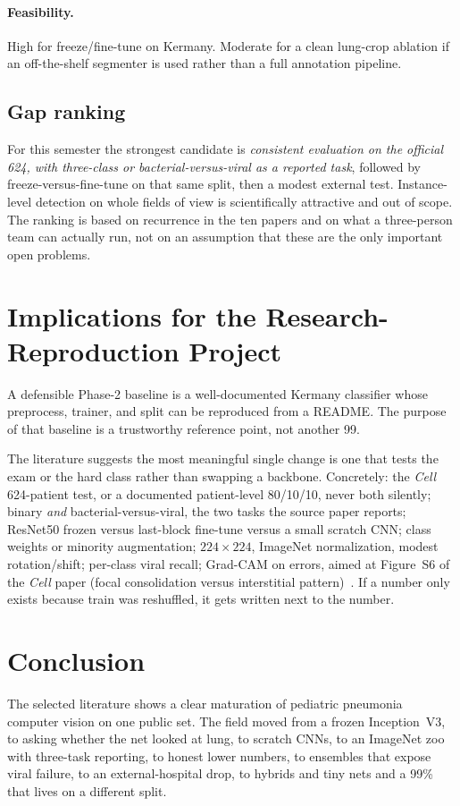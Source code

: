 \documentclass[11pt,a4paper]{article}
\begin{document}
\paragraph{Feasibility.}
High for freeze/fine-tune on Kermany. Moderate for a clean lung-crop ablation if an off-the-shelf segmenter is used rather than a full annotation pipeline.

\subsection{Gap ranking}
For this semester the strongest candidate is \emph{consistent evaluation on the official 624, with three-class or bacterial-versus-viral as a reported task}, followed by freeze-versus-fine-tune on that same split, then a modest external test. Instance-level detection on whole fields of view is scientifically attractive and out of scope. The ranking is based on recurrence in the ten papers and on what a three-person team can actually run, not on an assumption that these are the only important open problems.

\section{Implications for the Research-Reproduction Project}
A defensible Phase-2 baseline is a well-documented Kermany classifier whose preprocess, trainer, and split can be reproduced from a README. The purpose of that baseline is a trustworthy reference point, not another 99.

The literature suggests the most meaningful single change is one that tests the exam or the hard class rather than swapping a backbone. Concretely: the \textit{Cell} 624-patient test, or a documented patient-level 80/10/10, never both silently; binary \emph{and} bacterial-versus-viral, the two tasks the source paper reports; ResNet50 frozen versus last-block fine-tune versus a small scratch CNN; class weights or minority augmentation; $224\times 224$, ImageNet normalization, modest rotation/shift; per-class viral recall; Grad-CAM on errors, aimed at Figure~S6 of the \textit{Cell} paper (focal consolidation versus interstitial pattern)~\cite{kermany2018}. If a number only exists because train was reshuffled, it gets written next to the number.

\section{Conclusion}
The selected literature shows a clear maturation of pediatric pneumonia computer vision on one public set. The field moved from a frozen Inception~V3, to asking whether the net looked at lung, to scratch CNNs, to an ImageNet zoo with three-task reporting, to honest lower numbers, to ensembles that expose viral failure, to an external-hospital drop, to hybrids and tiny nets and a 99\% that lives on a different split.
\end{document}
